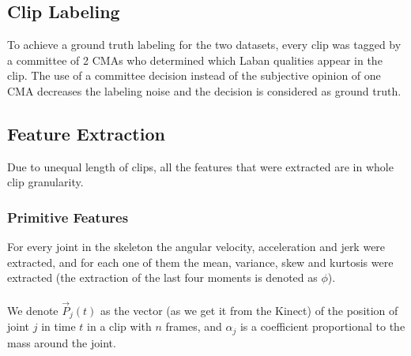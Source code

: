 \documentclass[journal]{journal}
\begin{document}
\subsection{Clip Labeling}
To achieve a ground truth labeling for the two datasets, every clip was tagged by
a committee of 2 CMAs who determined which Laban qualities appear in the
clip. The use of a committee decision instead of the subjective opinion of one
CMA decreases the labeling noise and the decision is considered as ground truth.
\subsection{Feature Extraction}
Due to unequal length of clips, all the features that were extracted are in
whole clip granularity.
\subsubsection{Primitive Features}
For every joint in the skeleton the angular velocity, acceleration and jerk were
extracted, and for each one of them the mean, variance, skew and kurtosis were
extracted (the extraction of the last four moments is denoted as $\phi$). 
\\\\We denote $\vec{P}_{j}(t)$ as the vector (as we get it from the Kinect) of
the position of joint $j$ in time $t$ in a clip with $n$ frames, and
$\alpha_{j}$ is a coefficient proportional to the mass around the joint.
\end{document}
